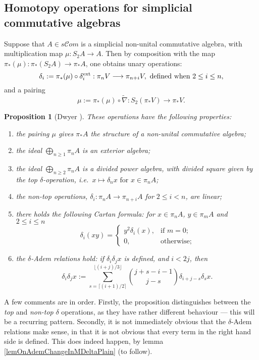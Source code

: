 \documentclass[11pt]{amsart}
\theoremstyle{plain}
\newtheorem{prop}[thm]{Proposition}
\theoremstyle{definition}
\renewcommand{\to}{\longrightarrow}
\newcommand{\scrC}{\mathscr{C}}
\theoremstyle{plain}
\newcommand{\algs}{\scrC\!\textit{om}}
\begin{document}
\begin{Constructing homotopy and cohomotopy operations}
\subsection{Homotopy operations for simplicial commutative algebras}\label{Homotopy operations for simplicial commutative algebras}
Suppose that $A\in s \algs$ is a simplicial non-unital commutative algebra, with multiplication map $\mu:S_2A\to A$. Then by composition with the map $\pi_*(\mu):\pi_*(S_2A)\to \pi_*A$, one obtains unary operations:
\[\delta_i:=\pi_*(\mu)\circ\delta_i^\textup{ext}:\pi_nV\to \pi_{n+i}V,\textup{ defined when }2\leq i\leq n,\]
and a pairing\[\mu:=\pi_*(\mu)\circ\widetilde{\nabla}:S_2(\pi_*V)\to \pi_{*}V.\]
\begin{prop}[Dwyer {\cite{DwyerHtpyOpsSimpComAlg.pdf}}]\label{omnibus on htpy of simp algs}These operations have the following properties:
\begin{enumerate}
\item the pairing $\mu$ gives $\pi_*A$ the structure of a non-unital commutative algebra;
\item the ideal $\bigoplus_{n\geq1}\pi_nA$ is an exterior algebra;
\item the ideal $\bigoplus_{n\geq2}\pi_nA$ is a divided power algebra, with divided square given by the \emph{top} $\delta$-operation, i.e.\ $x\mapsto \delta_nx\text{ for }x\in\pi_nA$;
\item the \emph{non-top operations}, $\delta_i:\pi_nA\to \pi_{n+i}A$ for $2\leq i<n$, are linear;
\item there holds the following \emph{Cartan formula}: for $x\in\pi_nA$, $y\in \pi_mA$ and $2\leq i\leq n$
\[\delta_i(xy)=\begin{cases}
y^2\delta_i(x),&\text{if }m=0;\\
0,&\text{otherwise};
\end{cases}
\]
\item \label{deltaademsunstable} the \emph{$\delta$-Adem relations} hold: if $\delta_i\delta_jx$ is defined, and $i<2j$, then
\[\delta_i\delta_jx:=\sum_{s=\lceil(i+1)/2\rceil}^{\lfloor(i+j)/3\rfloor}{j+s-i-1\choose j-s}\delta_{i+j-s}\delta_sx.\]
\end{enumerate}
\end{prop}
A few comments are in order. Firstly, the proposition distinguishes between the \emph{top} and \emph{non-top} $\delta$ operations, as they have rather different behaviour --- this will be a recurring pattern. Secondly, it is not immediately obvious that the $\delta$-Adem relations make sense, in that it is not obvious that every term in the right hand side is defined. This does indeed happen, by lemma \ref{lemOnAdemChangeInMDeltaPlain} (to follow). 


\end{Constructing homotopy and cohomotopy operations}
\end{document}
